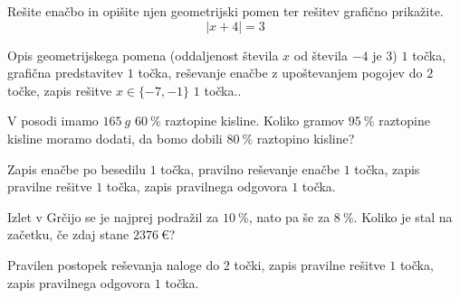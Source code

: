 \documentclass[addpoints]{exam}
\begin{document}
\begin{questions}
    \question[5]
    Rešite enačbo in opišite njen geometrijski pomen ter rešitev grafično prikažite.
    $$  \left\lvert x+4\right\rvert=3 $$
    
    
    \begin{solution}[8cm]
        Opis geometrijskega pomena (oddaljenost števila $x$ od števila $-4$ je $3$) $1$ točka, grafična predstavitev $1$ točka, reševanje enačbe z upoštevanjem pogojev do $2$ točke, zapis rešitve $x\in\{-7,-1\}$ $1$ točka..
    \end{solution}


    \newpage


    
    



    \question[4]
    V posodi imamo $165~g$ $60~\%$ raztopine kisline. Koliko gramov $95~\%$ raztopine kisline moramo dodati, da bomo dobili $80~\%$ raztopino kisline?
    
    
    \begin{solution}[10cm]
        Zapis enačbe po besedilu $1$ točka, pravilno reševanje enačbe $1$ točka, zapis pravilne rešitve $1$ točka, zapis pravilnega odgovora $1$ točka.
    \end{solution}




    \question[4]
    Izlet v Grčijo se je najprej podražil za $10~\%$, nato pa še za $8~\%$. 
    Koliko je stal na začetku, če zdaj stane $2376~€$?
    
    
    \begin{solution}[3cm]
        Pravilen postopek reševanja naloge do $2$ točki, zapis pravilne rešitve $1$ točka, zapis pravilnega odgovora $1$ točka.
    \end{solution}

     \newpage



    

\end{questions}
\end{document}
